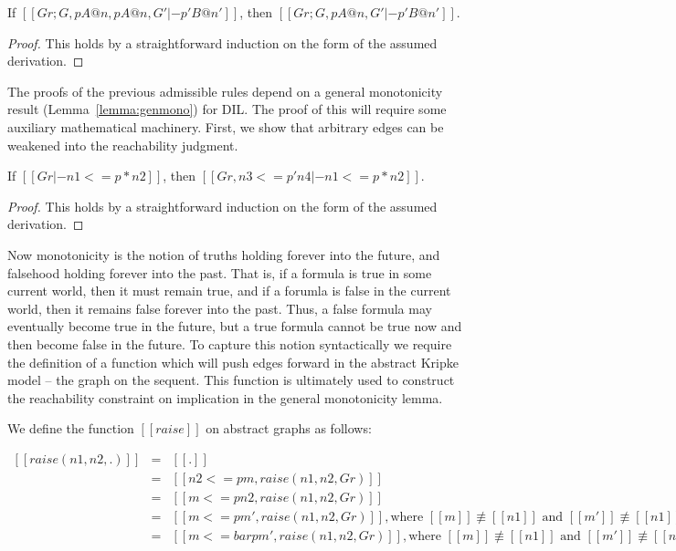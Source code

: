 \begin{lemma}[Contraction]
  \label{lemma:contract}
  If $[[Gr ; G , p A @ n , p A @ n , G' |- p' B @ n']]$, then
  $[[Gr ; G , p A @ n , G' |- p' B @ n']]$.
\end{lemma}
\begin{proof}
  This holds by a straightforward induction on the form of the assumed derivation.
\end{proof}

The proofs of the previous admissible rules depend on a general
monotonicity result (Lemma~\ref{lemma:genmono}) for DIL.  The proof of
this will require some auxiliary mathematical machinery. First, we
show that arbitrary edges can be weakened into the reachability
judgment.
\begin{lemma}
  \label{lemma:graph_weakening}
  If $[[Gr |- n1 <= p * n2]]$, then $[[Gr, n3 <= p' n4 |- n1 <= p * n2]]$.
\end{lemma}
\begin{proof}
  This holds by a straightforward induction on the form of the assumed derivation.
\end{proof}
Now monotonicity is the notion of truths holding forever into the
future, and falsehood holding forever into the past.  That is, if a
formula is true in some current world, then it must remain true, and
if a forumla is false in the current world, then it remains false
forever into the past.  Thus, a false formula may eventually become true
in the future, but a true formula cannot be true now and then become
false in the future.  To capture this notion syntactically we require
the definition of a function which will push edges forward in the
abstract Kripke model -- the graph on the sequent.   This function is
ultimately used to construct the reachability constraint on
implication in the general monotonicity lemma.
\begin{definition}
  \label{def:raise}
  We define the function $[[raise]]$ on abstract graphs as follows:
  \begin{center}
    \small
    \begin{math}
      \begin{array}{lll}
        [[raise ( n1 , n2 , . )]] & = & [[.]]\\
        [[raise ( n1 , n2 , (n1 <=p  m, Gr))]] & = & [[n2 <=p m , raise (n1 , n2, Gr)]]\\
        [[raise ( n1 , n2 , ( m <=p n1, Gr))]] & = & [[m <= p n2 , raise (n1 , n2, Gr)]]\\
        [[raise ( n1 , n2 , (m <=p m' , Gr ))]] & = & [[m <=  p m' , raise (n1 , n2, Gr)]], 
        \text{where } [[m]] \not\equiv [[n1]] \text{ and } [[m']] \not\equiv [[n1]].\\
        [[raise ( n1 , n2 , (m <=bar p m' , Gr ))]] & = &[[m <=  bar p m' , raise (n1 , n2, Gr)]],
        \text{where } [[m]] \not\equiv [[n1]] \text{ and } [[m']] \not\equiv [[n1]].\\
      \end{array}
    \end{math}
  \end{center}
\end{definition}
